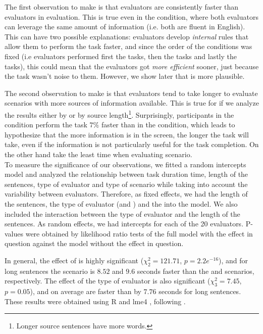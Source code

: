 The first observation to make is that \bil evaluators are consistently faster than \mono evaluators in evaluation. This is true even in the \tgt condition, where both evaluators can leverage the same amount of information (i.e. both are fluent in English). %
This can have two possible explanations: \Ni \bil evaluators develop \emph{internal} rules that allow them to perform the task faster, and \Nii since the order of the conditions was fixed (i.e evaluators performed first the \src tasks, then the \srctgt tasks and lastly the \tgt tasks), this could mean that the \bil evaluators got \emph{more efficient} sooner, just because the \src task wasn't noise to them. However, we show later that \Ni is more plausible.

The second observation to make is that evaluators tend to take longer to evaluate scenarios with more sources of information available. This is true for \mono if we analyze the results either by \gamet or by source length\footnote{Longer source sentences have more words.}. Surprisingly, \mono participants in the \src condition perform the task $7\%$ faster than in the \srctgt condition, which leads to hypothesize that the more information is in the screen, the longer the task will take, even if the information is not particularly useful for the task completion. On the other hand \bil take the least time when evaluating \tgt scenario.\\ %

To measure the significance of our observations, we fitted a random intercepts model  and analyzed the relationship between task duration time, length of the sentences, type of evaluator and type of scenario while taking into account the variability between evaluators. Therefore, as fixed effects, we had the length of the sentences, the type of evaluator (\bil and \mono) and the \gamet into the model. We also included the interaction between the type of evaluator and the length of the sentences. As random effects, we had intercepts for each of the 20 evaluators. P-values were obtained by likelihood ratio tests of the full model with the effect in question against the model without the effect in question. 
\vspace{5pt}

In general, the effect of \gamet is highly significant ($\chi^2_{2}=121.71$, $p=2.2e^{-16}$), and for long sentences the \tgt scenario is $8.52$ and $9.6$ seconds faster than the \src and \srctgt scenarios, respectively. The effect of the type of evaluator is also significant  ($\chi^2_{3}=7.45$, $p=0.05$), and on average \bil are faster than \mono by $7.76$ seconds for long sentences. These results were obtained using R \cite{R:2015} and lme4 \cite{LM4:2015}, following .


